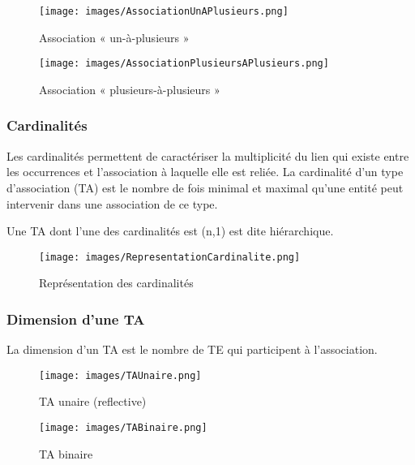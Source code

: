 \documentclass[10pt]{article}
\begin{document}
				\begin{figure}[H]
					\begin{center}
						\texttt{[image: images/AssociationUnAPlusieurs.png]}
					\end{center}
					\caption{Association « un-à-plusieurs »}
				\end{figure}
				
				\begin{figure}[H]
					\begin{center}
						\texttt{[image: images/AssociationPlusieursAPlusieurs.png]}
					\end{center}
					\caption{Association « plusieurs-à-plusieurs »}
				\end{figure}
				
			\subsubsection{Cardinalités}
				Les cardinalités permettent de caractériser la multiplicité du lien qui existe entre les occurrences et l'association à laquelle elle est reliée. La cardinalité d'un type d'association (TA) est le nombre de fois minimal et maximal qu'une entité peut intervenir dans une association de ce type.
				
				Une TA dont l'une des cardinalités est (n,1) est dite hiérarchique.
				
				\begin{figure}[H]
					\begin{center}
						\texttt{[image: images/RepresentationCardinalite.png]}
					\end{center}
					\caption{Représentation des cardinalités}
				\end{figure}
			
			\subsubsection{Dimension d'une TA}
				La dimension d'un TA est le nombre de TE qui participent à l'association.
				
				\begin{figure}[H]
					\begin{center}
						\texttt{[image: images/TAUnaire.png]}
					\end{center}
					\caption{TA unaire (reflective)}
				\end{figure}
				
				\begin{figure}[H]
					\begin{center}
						\texttt{[image: images/TABinaire.png]}
					\end{center}
					\caption{TA binaire}
				\end{figure}
				
\end{document}
